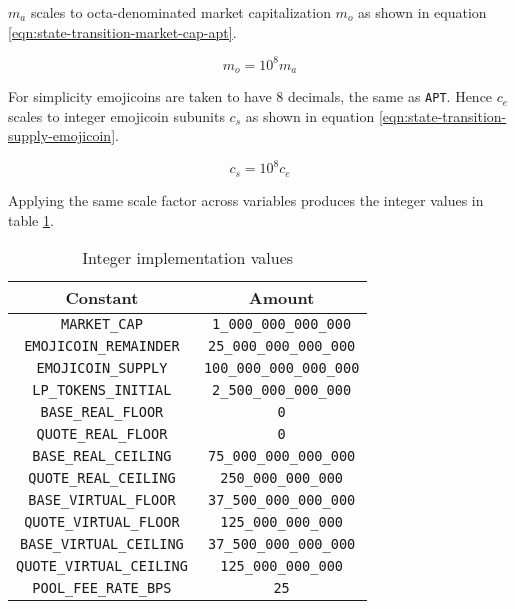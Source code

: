 \documentclass[table, twocolumn]{article}
\begin{document}
$m_a$ scales to octa-denominated \cite{octa} market capitalization $m_o$ as shown in
equation \ref{eqn:state-transition-market-cap-apt}.

\begin{equation} \label{eqn:state-transition-market-cap-apt}
  m_o = 10^8 m_a
\end{equation}

For simplicity emojicoins are taken to have 8 decimals, the same as \texttt{APT}. Hence
$c_e$ scales to integer emojicoin subunits $c_s$ as shown in equation
\ref{eqn:state-transition-supply-emojicoin}.

\begin{equation} \label{eqn:state-transition-supply-emojicoin}
  c_s = 10^8 c_e
\end{equation}

Applying the same scale factor across variables produces the integer values in table
\ref{tab:integer-implementation-values}.

\begin{table}[!htb]
  \centering
  \begin{tabular}{|c|c|}
    \hline \rowcolor{blue}
    Constant                         & Amount                           \\ \hline
    \texttt{MARKET\_CAP}             & \texttt{1\_000\_000\_000\_000}   \\ \hline
    \texttt{EMOJICOIN\_REMAINDER}    & \texttt{25\_000\_000\_000\_000}  \\ \hline
    \texttt{EMOJICOIN\_SUPPLY}       & \texttt{100\_000\_000\_000\_000} \\ \hline
    \texttt{LP\_TOKENS\_INITIAL}     & \texttt{2\_500\_000\_000\_000}   \\ \hline
    \texttt{BASE\_REAL\_FLOOR}       & \texttt{0}                       \\ \hline
    \texttt{QUOTE\_REAL\_FLOOR}      & \texttt{0}                       \\ \hline
    \texttt{BASE\_REAL\_CEILING}     & \texttt{75\_000\_000\_000\_000}  \\ \hline
    \texttt{QUOTE\_REAL\_CEILING}    & \texttt{250\_000\_000\_000}      \\ \hline
    \texttt{BASE\_VIRTUAL\_FLOOR}    & \texttt{37\_500\_000\_000\_000}  \\ \hline
    \texttt{QUOTE\_VIRTUAL\_FLOOR}   & \texttt{125\_000\_000\_000}      \\ \hline
    \texttt{BASE\_VIRTUAL\_CEILING}  & \texttt{37\_500\_000\_000\_000}  \\ \hline
    \texttt{QUOTE\_VIRTUAL\_CEILING} & \texttt{125\_000\_000\_000}      \\ \hline
    \texttt{POOL\_FEE\_RATE\_BPS}    & \texttt{25}                      \\ \hline
  \end{tabular}
  \caption{Integer implementation values}
  \label{tab:integer-implementation-values}
\end{table}
\end{document}
